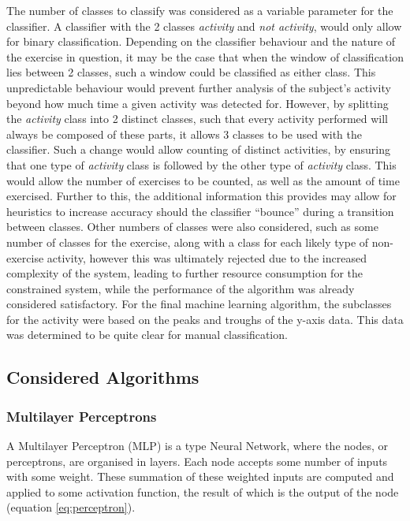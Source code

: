 The number of classes to classify was considered as a variable parameter for the classifier. A classifier with the 2 classes \textit{activity} and \textit{not activity}, would only allow for binary classification. Depending on the classifier behaviour and the nature of the exercise in question, it may be the case that when the window of classification lies between 2 classes, such a window could be classified as either class. This unpredictable behaviour would prevent further analysis of the subject's activity beyond how much time a given activity was detected for. However, by splitting the \textit{activity} class into 2 distinct classes, such that every activity performed will always be composed of these parts, it allows 3 classes to be used with the classifier. Such a change would allow counting of distinct activities, by ensuring that one type of \textit{activity} class is followed by the other type of \textit{activity} class. This would allow the number of exercises to be counted, as well as the amount of time exercised. Further to this, the additional information this provides may allow for heuristics to increase accuracy should the classifier ``bounce'' during a transition between classes.  Other numbers of classes were also considered, such as some number of classes for the exercise, along with a class for each likely type of non-exercise activity, however this was ultimately rejected due to the increased complexity of the system, leading to further resource consumption for the constrained system, while the performance of the algorithm was already considered satisfactory. For the final machine learning algorithm, the subclasses for the activity were based on the peaks and troughs of the y-axis data. This data was determined to be quite clear for manual classification.


\subsection{Considered Algorithms}
\subsubsection{Multilayer Perceptrons}
A Multilayer Perceptron (MLP) is a type Neural Network, where the nodes, or perceptrons, are organised in layers. Each node accepts some number of inputs with some weight. These summation of these weighted inputs are computed and applied to some activation function, the result of which is the output of the node (equation \ref{eq:perceptron}).

